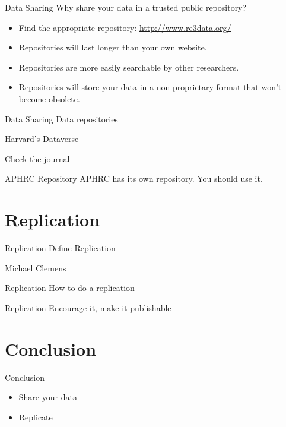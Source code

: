 \documentclass{beamer}
\begin{document}

\begin{frame}{Data Sharing}
Why share your data in a trusted public repository?
\begin{itemize}[<.->]
\item
Find the appropriate repository: \url{http://www.re3data.org/}
\item
Repositories will last longer than your own website.
\item
Repositories are more easily searchable by other researchers.
\item
Repositories will store your data in a non-proprietary format that won't become obsolete.
\end{itemize}
\end{frame}

\begin{frame}{Data Sharing}
Data repositories

Harvard's Dataverse

Check the journal
\end{frame}

\begin{frame}{APHRC Repository}
APHRC has its own repository. You should use it.
\end{frame}


\section{Replication}
\begin{frame}{Replication}
Define Replication

Michael Clemens
\end{frame}


\begin{frame}{Replication}
How to do a replication
\end{frame}


\begin{frame}{Replication}
Encourage it, make it publishable
\end{frame}

\section{Conclusion}
\begin{frame}{Conclusion}
\begin{itemize}
\item Share your data
\item Replicate
\end{itemize}
\end{frame}
\end{document}

